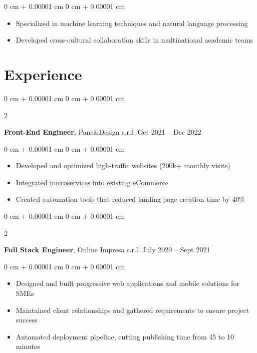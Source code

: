 \documentclass[10pt, letterpaper]{article}
\newenvironment{highlights}{
    \begin{itemize}[
        topsep=0.10 cm,
        parsep=0.10 cm,
        partopsep=0pt,
        itemsep=0pt,
        leftmargin=0 cm + 10pt
    ]
}{
    \end{itemize}
} %
\newenvironment{onecolentry}{
    \begin{adjustwidth}{
        0 cm + 0.00001 cm
    }{
        0 cm + 0.00001 cm
    }
}{
    \end{adjustwidth}
} %
\newenvironment{twocolentry}[2][]{
    \onecolentry
    \def\secondColumn{#2}
    \setcolumnwidth{\fill, 4.5 cm}
    \begin{paracol}{2}
}{
    \switchcolumn \raggedleft \secondColumn
    \end{paracol}
    \endonecolentry
} %
\begin{document}
        \vspace{0.10 cm}
        \begin{onecolentry}
            \begin{highlights}
                \item Specialized in machine learning techniques and natural language processing
                \item Developed cross-cultural collaboration skills in multinational academic teams
            \end{highlights}
        \end{onecolentry}
    
    \section{Experience}
        
        \begin{twocolentry}{
            Oct 2021 – Dec 2022
        }
        \textbf{Front-End Engineer}, Pane\&Design s.r.l.\end{twocolentry}

        \vspace{0.10 cm}
        \begin{onecolentry}
            \begin{highlights}
                \item Developed and optimized high-traffic websites (200k+ monthly visits)
                \item Integrated microservices into existing eCommerce
                \item Created automation tools that reduced landing page creation time by 40\%
            \end{highlights}
        \end{onecolentry}


        \vspace{0.2 cm}

        \begin{twocolentry}{
            July 2020 – Sept 2021
        }
        \textbf{Full Stack Engineer}, Online Impresa s.r.l.\end{twocolentry}

        \vspace{0.10 cm}
        \begin{onecolentry}
            \begin{highlights}
                \item Designed and built progressive web applications and mobile solutions for SMEs
                \item Maintained client relationships and gathered requirements to ensure project success
                \item Automated deployment pipeline, cutting publishing time from 45 to 10 minutes
            \end{highlights}
        \end{onecolentry}
\end{document}
